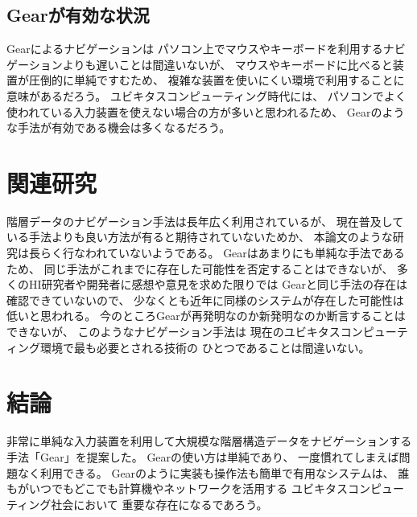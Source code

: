 \documentclass[twoside]{wiss}
\def\GEAR{\textsf{Gear}}
\begin{document}
% 

\subsection{{\GEAR}が有効な状況}

{\GEAR}によるナビゲーションは
パソコン上でマウスやキーボードを利用するナビゲーションよりも遅いことは間違いないが、
マウスやキーボードに比べると装置が圧倒的に単純ですむため、
複雑な装置を使いにくい環境で利用することに意味があるだろう。
ユビキタスコンピューティング時代には、
パソコンでよく使われている入力装置を使えない場合の方が多いと思われるため、
{\GEAR}のような手法が有効である機会は多くなるだろう。


\section{関連研究}

階層データのナビゲーション手法は長年広く利用されているが、
現在普及している手法よりも良い方法が有ると期待されていないためか、
本論文のような研究は長らく行なわれていないようである。
%
{\GEAR}はあまりにも単純な手法であるため、
同じ手法がこれまでに存在した可能性を否定することはできないが、
多くのHI研究者や開発者に感想や意見を求めた限りでは
{\GEAR}と同じ手法の存在は確認できていないので、
少なくとも近年に同様のシステムが存在した可能性は低いと思われる。
%
今のところ{\GEAR}が再発明なのか新発明なのか断言することはできないが、
このようなナビゲーション手法は
現在のユビキタスコンピューティング環境で最も必要とされる技術の
ひとつであることは間違いない。

\section{結論}

非常に単純な入力装置を利用して大規模な階層構造データをナビゲーションする
手法「{\GEAR}」を提案した。
{\GEAR}の使い方は単純であり、
一度慣れてしまえば問題なく利用できる。
%
{\GEAR}のように実装も操作法も簡単で有用なシステムは、
誰もがいつでもどこでも計算機やネットワークを活用する
ユビキタスコンピューティング社会において
重要な存在になるであろう。

{\scriptsize


}
\end{document}
